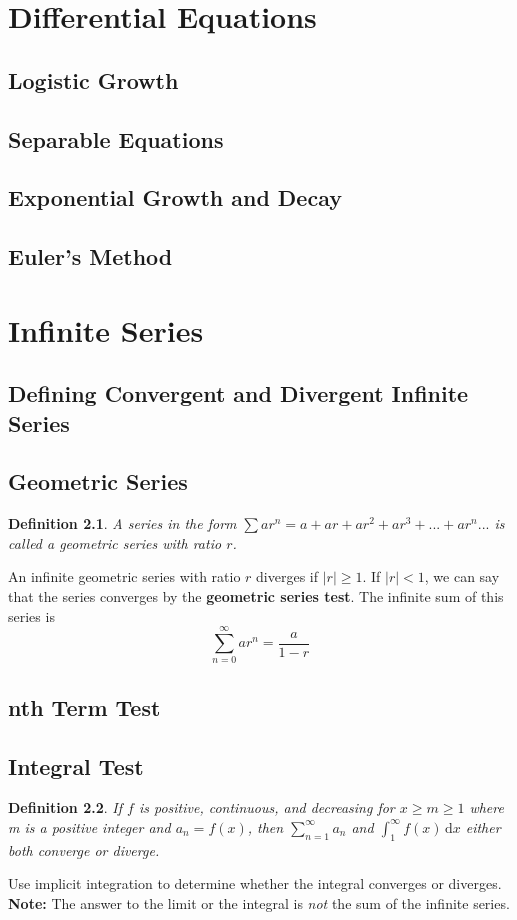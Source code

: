 \documentclass[letterpaper]{report}
\newtheorem{definition}{Definition}
\begin{document}
\chapter{Differential Equations}
\section{Logistic Growth}
\section{Separable Equations}
\section{Exponential Growth and Decay}
\section{Euler's Method}

\chapter{Infinite Series}
\section{Defining Convergent and Divergent Infinite Series}
\section{Geometric Series}
\begin{definition}
A series in the form $\sum{ar^n} = a + ar + ar^2 + ar^3 + ... + ar^n ...$
is called a geometric series with ratio $r$.
\end{definition}
An infinite geometric series with ratio $r$ diverges if $|r|\geq1$.
If $|r|<1$, we can say that the series converges by the 
\textbf{geometric series test}. The infinite sum of this series is
\[ \sum_{n=0}^\infty ar^n = \frac{a}{1-r} \]
\section{nth Term Test}
\section{Integral Test}
\begin{definition}
If $f$ is positive, continuous, and decreasing for $x\geq{}m\geq{}1$ where
m is a positive integer and $a_n=f(x)$, then $\sum_{n=1}^\infty a_n$ and
$\int_1^\infty f(x) \, \mathrm{d}x$ either both converge or diverge.
\end{definition}
Use implicit integration to determine whether the integral converges or diverges.
\textbf{Note:} The answer to the limit or the integral is \textit{not} the 
sum of the infinite series.
\end{document}

